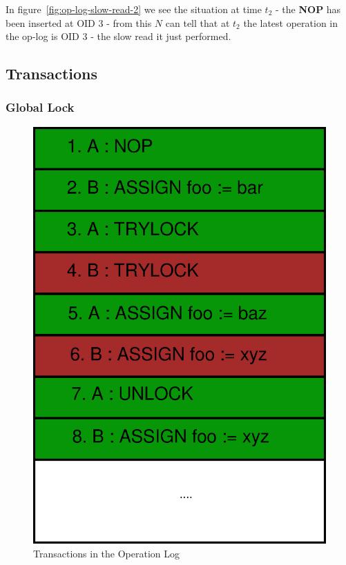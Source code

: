 \documentclass[12pt,twoside,notitlepage]{report}
\newcommand{\op}[1]  {{\bf #1}}         %
\begin{document}
In figure~\ref{fig:op-log-slow-read-2} we see the situation at time $t_2$ - the \op{NOP} has been
inserted at OID 3 - from this $N$ can tell that at $t_2$ the latest operation in the op-log is OID
3 - the slow read it just performed.

\subsection{Transactions}

\subsubsection{Global Lock}

\begin{figure}[htb]
\centering
\includegraphics[scale=0.5]{figs/op-log-trylock.eps}
\caption{\label{fig:op-log-trylock}Transactions in the Operation Log}
\end{figure}
\end{document}
